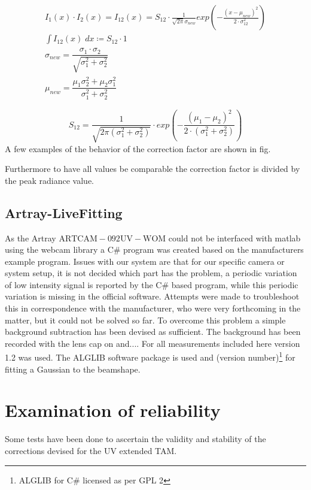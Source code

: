 \documentclass[10pt,a4paper]{article}
\begin{document}
\begin{gather}
I_1(x)\cdot I_2(x) = I_{12}(x) = S_{12}\cdot \frac{1}{\sqrt{2\pi}\sigma_{new}} exp\left(-\frac{\left(x-\mu_{new}\right)^2}{2\cdot\sigma_{12}^2}\right)\\
\int I_{12}(x)\; dx \coloneqq S_{12} \cdot 1\\
\sigma_{new} = \dfrac{\sigma_1 \cdot \sigma_2}{\sqrt{\sigma_1^2+\sigma_2^2}}\\
\mu_{new} = \dfrac{\mu_1\sigma_2^2 + \mu_2\sigma_1^2}{\sigma_1^2 + \sigma_2^2}
\end{gather}



\begin{equation}
S_{12} = \dfrac{1}{\sqrt{2\pi\left(\sigma_1^2+\sigma_2^2\right)}}\cdot exp\left(-\dfrac{\left(\mu_1 - \mu_2\right)^2}{2\cdot \left(\sigma_1^2+\sigma_2^2\right)}\right)
\end{equation}
A few examples of the behavior of the correction factor are shown in fig.

Furthermore to have all values be comparable the correction factor is divided by the peak radiance value.


\subsection{Artray-LiveFitting}
As the Artray $\mathrm{ARTCAM-092UV-WOM}$ could not be interfaced with matlab using the webcam library a C\# program was created based on the manufacturers example program.
Issues with our system are that for our specific camera or system setup, it is not decided which part has the problem, a periodic variation of low intensity signal is reported by the C\# based program, while this periodic variation is missing in the official software. Attempts were made to troubleshoot this in correspondence with the manufacturer, who were very forthcoming in the matter, but it could not be solved so far. To overcome this problem a simple background subtraction has been devised as sufficient. The background has been recorded with the lens cap on and....
\newline
For all measurements included here version 1.2 was used. The  ALGLIB software package is used and (version number)\footnote{ALGLIB for C\# licensed as per GPL 2} for fitting a Gaussian to the beamshape.\

\section{Examination of reliability}
Some tests have been done to ascertain the validity and stability of the corrections devised for the UV extended TAM.
\end{document}
